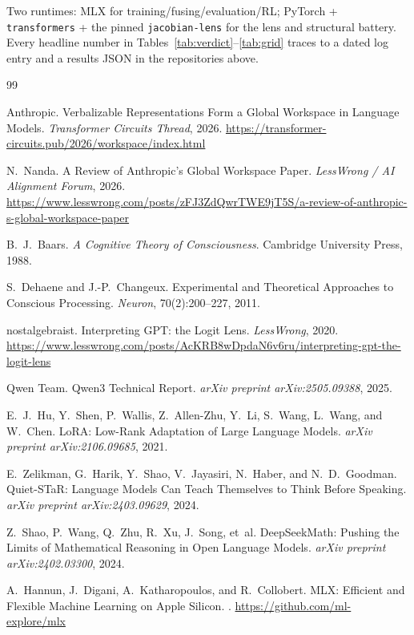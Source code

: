 \documentclass[11pt]{article}
\begin{document}
Two runtimes: MLX for training/fusing/evaluation/RL; PyTorch + \texttt{transformers}
+ the pinned \texttt{jacobian-lens} for the lens and structural battery. Every
headline number in Tables~\ref{tab:verdict}--\ref{tab:grid} traces to a dated log
entry and a results JSON in the repositories above.

\begin{thebibliography}{99}
\small

Anthropic.
\newblock Verbalizable Representations Form a Global Workspace in Language Models.
\newblock \emph{Transformer Circuits Thread}, 2026.
\newblock \url{https://transformer-circuits.pub/2026/workspace/index.html}

N.~Nanda.
\newblock A Review of Anthropic's Global Workspace Paper.
\newblock \emph{LessWrong / AI Alignment Forum}, 2026.
\newblock \url{https://www.lesswrong.com/posts/zFJ3ZdQwrTWE9jT5S/a-review-of-anthropic-s-global-workspace-paper}

B.~J.~Baars.
\newblock \emph{A Cognitive Theory of Consciousness}.
\newblock Cambridge University Press, 1988.

S.~Dehaene and J.-P.~Changeux.
\newblock Experimental and Theoretical Approaches to Conscious Processing.
\newblock \emph{Neuron}, 70(2):200--227, 2011.

nostalgebraist.
\newblock Interpreting GPT: the Logit Lens.
\newblock \emph{LessWrong}, 2020.
\newblock \url{https://www.lesswrong.com/posts/AcKRB8wDpdaN6v6ru/interpreting-gpt-the-logit-lens}

Qwen Team.
\newblock Qwen3 Technical Report.
\newblock \emph{arXiv preprint arXiv:2505.09388}, 2025.

E.~J.~Hu, Y.~Shen, P.~Wallis, Z.~Allen-Zhu, Y.~Li, S.~Wang, L.~Wang, and W.~Chen.
\newblock LoRA: Low-Rank Adaptation of Large Language Models.
\newblock \emph{arXiv preprint arXiv:2106.09685}, 2021.

E.~Zelikman, G.~Harik, Y.~Shao, V.~Jayasiri, N.~Haber, and N.~D.~Goodman.
\newblock Quiet-STaR: Language Models Can Teach Themselves to Think Before Speaking.
\newblock \emph{arXiv preprint arXiv:2403.09629}, 2024.

Z.~Shao, P.~Wang, Q.~Zhu, R.~Xu, J.~Song, et~al.
\newblock DeepSeekMath: Pushing the Limits of Mathematical Reasoning in Open
Language Models.
\newblock \emph{arXiv preprint arXiv:2402.03300}, 2024.

A.~Hannun, J.~Digani, A.~Katharopoulos, and R.~Collobert.
\newblock MLX: Efficient and Flexible Machine Learning on Apple Silicon.
.
\newblock \url{https://github.com/ml-explore/mlx}

\end{thebibliography}
\end{document}
